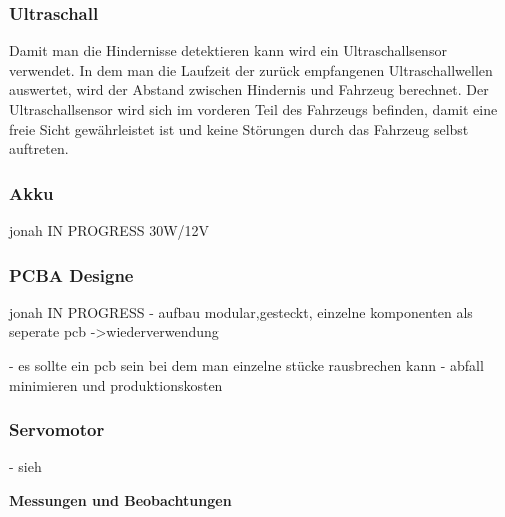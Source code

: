 \subsubsection{Ultraschall}

Damit man die Hindernisse detektieren kann wird ein Ultraschallsensor verwendet. In dem man die Laufzeit der zurück empfangenen Ultraschallwellen auswertet, wird der Abstand zwischen Hindernis und Fahrzeug berechnet. Der Ultraschallsensor wird sich im vorderen Teil des Fahrzeugs befinden, damit eine freie Sicht gewährleistet ist und keine Störungen durch das Fahrzeug selbst auftreten.

\subsubsection{Akku}

jonah
IN PROGRESS
30W/12V

\subsubsection{PCBA Designe}

jonah
IN PROGRESS
- aufbau modular,gesteckt, einzelne komponenten als seperate pcb ->wiederverwendung

- es sollte ein pcb sein bei dem man einzelne stücke rausbrechen kann
- abfall minimieren und produktionskosten



\subsubsection{Servomotor}

- sieh



\textbf{Messungen und Beobachtungen}

